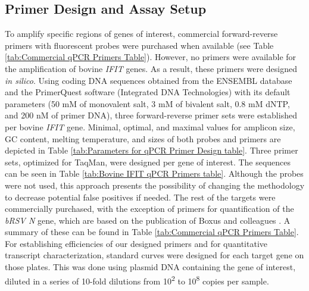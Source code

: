 \subsection{Primer Design and Assay Setup} \label{subsec:Primer Design and Assay Setup}
To amplify specific regions of genes of interest, commercial forward-reverse primers with fluorescent probes were purchased when available (see Table \ref{tab:Commercial qPCR Primers Table}). However, no primers were available for the amplification of bovine \textit{IFIT} genes. As a result, these primers were designed \textit{in silico}. Using coding DNA sequences obtained from the ENSEMBL database \cite{Cunningham2022Ensembl2022} and the PrimerQuest software (Integrated DNA Technologies) with its default parameters (50 mM of monovalent salt, 3 mM of bivalent salt, 0.8 mM dNTP, and 200 nM of primer DNA), three forward-reverse primer sets were established per bovine \textit{IFIT} gene. Minimal, optimal, and maximal values for amplicon size, GC content, melting temperature, and sizes of both probes and primers are depicted in Table \ref{tab:Parameters for qPCR Primer Design table}. Three primer sets, optimized for TaqMan, were designed per gene of interest. The sequences can be seen in Table \ref{tab:Bovine IFIT qPCR Primers table}. Although the probes were not used, this approach presents the possibility of changing the methodology to decrease potential false positives if needed. The rest of the targets were commercially purchased, with the exception of primers for quantification of the \textit{bRSV N} gene, which are based on the publication of Boxus and colleagues \cite{Boxus2005RealVirus}. A summary of these can be found in Table \ref{tab:Commercial qPCR Primers Table}. For establishing efficiencies of our designed primers and for quantitative transcript characterization, standard curves were designed for each target gene on those plates. This was done using plasmid DNA containing the gene of interest, diluted in a series of 10-fold dilutions from 10\textsuperscript{2} to 10\textsuperscript{8} copies per sample.

